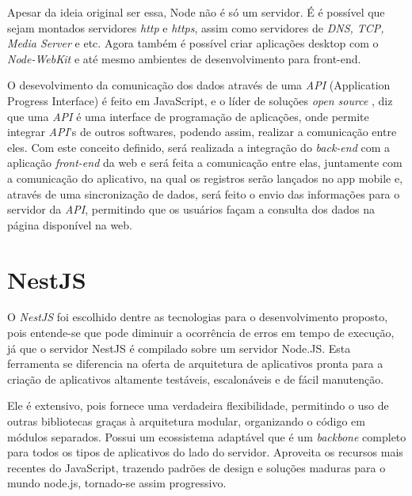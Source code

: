 Apesar da ideia original ser essa, Node não é só um servidor. É é possível que sejam montados servidores \textit{http} e  \textit{https}, assim como servidores de  \textit{DNS, TCP, Media Server} e etc. Agora também é possível criar aplicações desktop com o  \textit{Node-WebKit} e até mesmo ambientes de desenvolvimento para front-end. \cite{node1}



O desevolvimento da comunicação dos dados através de uma \textit{API} (Application Progress Interface) é feito em JavaScript,  e o líder de soluções \textit{open source} , diz que uma \textit{API} é uma interface de programação de aplicações, onde permite integrar \textit{API}'s de outros softwares, podendo assim, realizar a comunicação entre eles. Com este conceito definido, será realizada a integração do \textit{back-end} com a aplicação \textit{front-end} da web e será feita a comunicação entre elas, juntamente com a comunicação do aplicativo, na qual os registros serão lançados no app mobile e, através de uma sincronização de dados, será feito o envio das informações para o servidor da \textit{API}, permitindo que os usuários façam a consulta dos dados na página disponível na web.

\section{NestJS}
O \textit{NestJS} foi escolhido dentre as tecnologias para o desenvolvimento proposto, pois entende-se que pode diminuir a ocorrência de erros em tempo de execução, já que o servidor NestJS é compilado sobre um servidor Node.JS. Esta ferramenta se diferencia na oferta de arquitetura de aplicativos pronta para a criação de aplicativos altamente testáveis, escalonáveis e de fácil manutenção.

Ele é extensivo, pois fornece uma verdadeira flexibilidade, permitindo o uso de outras bibliotecas graças à arquitetura modular, organizando o código em módulos separados. Possui um ecossistema adaptável que é um \textit{backbone} completo para todos os tipos de aplicativos do lado do servidor. Aproveita os recursos mais recentes do JavaScript, trazendo padrões de design e soluções maduras para o mundo node.js, tornado-se assim progressivo. \cite{nest}

